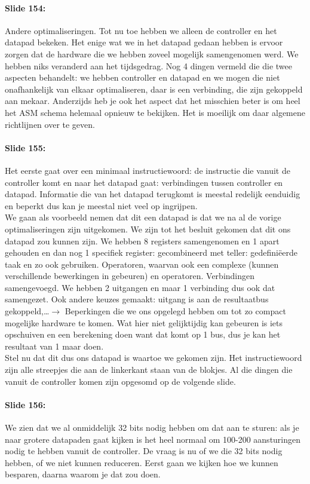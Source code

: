 \documentclass[10pt,a4paper]{book}
\begin{document}
\paragraph{Slide 154:} Andere optimaliseringen. Tot nu toe hebben we alleen de controller en het datapad bekeken. Het enige wat we in het datapad gedaan hebben is ervoor zorgen dat de hardware die we hebben zoveel mogelijk samengenomen werd. We hebben niks veranderd aan het tijdsgedrag. Nog 4 dingen vermeld die die twee aspecten behandelt: we hebben controller en datapad en we mogen die niet onafhankelijk van elkaar optimaliseren, daar is een verbinding, die zijn gekoppeld aan mekaar. Anderzijds heb je ook het aspect dat het misschien beter is om heel het ASM schema helemaal opnieuw te bekijken. Het is moeilijk om daar algemene richtlijnen over te geven.

\paragraph{Slide 155:} Het eerste gaat over een minimaal instructiewoord: de instructie die vanuit de controller komt en naar het datapad gaat: verbindingen tussen controller en datapad. Informatie die van het datapad terugkomt is meestal redelijk eenduidig en beperkt dus kan je meestal niet veel op ingrijpen.\\
We gaan als voorbeeld nemen dat dit een datapad is dat we na al de vorige optimaliseringen zijn uitgekomen. We zijn tot het besluit gekomen dat dit ons datapad zou kunnen zijn. We hebben 8 registers samengenomen en 1 apart gehouden en dan nog 1 specifiek register: gecombineerd met teller: gedefini\"eerde taak en zo ook gebruiken. Operatoren, waarvan ook een complexe (kunnen verschillende bewerkingen in gebeuren) en operatoren. Verbindingen samengevoegd. We hebben 2 uitgangen en maar 1 verbinding dus ook dat samengezet. Ook andere keuzes gemaakt: uitgang is aan de resultaatbus gekoppeld,\ldots $\rightarrow$ Beperkingen die we ons opgelegd hebben om tot zo compact mogelijke hardware te komen. Wat hier niet gelijktijdig kan gebeuren is iets opschuiven en een berekening doen want dat komt op 1 bus, dus je kan het resultaat van 1 maar doen.\\
Stel nu dat dit dus ons datapad is waartoe we gekomen zijn. Het instructiewoord zijn alle streepjes die aan de linkerkant staan van de blokjes. Al die dingen die vanuit de controller komen zijn opgesomd op de volgende slide.

\paragraph{Slide 156:} We zien dat we al onmiddelijk 32 bits nodig hebben om dat aan te sturen: als je naar grotere datapaden gaat kijken is het heel normaal om 100-200 aansturingen nodig te hebben vanuit de controller. De vraag is nu of we die 32 bits nodig hebben, of we niet kunnen reduceren. Eerst gaan we kijken hoe we kunnen besparen, daarna waarom je dat zou doen.
\end{document}
